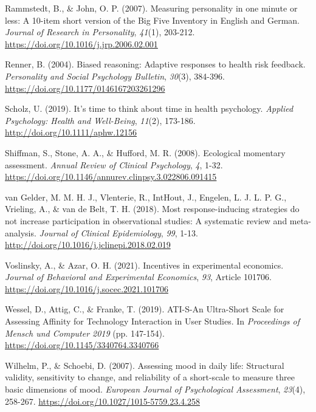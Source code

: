 \documentclass[authordate, empirical]{jote-new-article}
\begin{document}
	Rammstedt, B., \& John, O. P. (2007). Measuring personality in one minute or less: A 10-item short version of the Big Five Inventory in English and German. \emph{Journal of Research in Personality},\emph{ 41}(1), 203-212. \href{https://doi.org/10.1016/j.jrp.2006.02.001}{https://doi.org/10.1016/j.jrp.2006.02.001}



	Renner, B. (2004). Biased reasoning: Adaptive responses to health risk feedback. \emph{Personality and Social Psychology Bulletin},\emph{ 30}(3), 384-396. \href{https://doi.org/10.1177/0146167203261296}{https://doi.org/10.1177/0146167203261296}



	Scholz, U. (2019). It's time to think about time in health psychology. \emph{Applied Psychology: Health and Well-Being},\emph{ 11}(2), 173-186. \href{http://doi.org/10.1111/aphw.12156}{http://doi.org/10.1111/aphw.12156}



	Shiffman, S., Stone, A. A., \& Hufford, M. R. (2008). Ecological momentary assessment. \emph{Annual Review of Clinical Psychology},\emph{ 4}, 1-32. \href{https://doi.org/10.1146/annurev.clinpsy.3.022806.091415}{https://doi.org/10.1146/annurev.clinpsy.3.022806.091415}



	van Gelder, M. M. H. J., Vlenterie, R., IntHout, J., Engelen, L. J. L. P. G., Vrieling, A., \& van de Belt, T. H. (2018). Most response-inducing strategies do not increase participation in observational studies: A systematic review and meta-analysis. \emph{Journal of Clinical Epidemiology},\emph{ 99}, 1-13. \href{http://doi.org/10.1016/j.jclinepi.2018.02.019}{http://doi.org/10.1016/j.jclinepi.2018.02.019}



	Voslinsky, A., \& Azar, O. H. (2021). Incentives in experimental economics. \emph{Journal of Behavioral and Experimental Economics},\emph{ 93}, Article 101706. \href{https://doi.org/10.1016/j.socec.2021.101706}{https://doi.org/10.1016/j.socec.2021.101706}



	Wessel, D., Attig, C., \& Franke, T. (2019). ATI-S-An Ultra-Short Scale for Assessing Affinity for Technology Interaction in User Studies. In \emph{Proceedings of Mensch und Computer 2019} (pp. 147-154). \href{https://doi.org/10.1145/3340764.3340766}{https://doi.org/10.1145/3340764.3340766}



	Wilhelm, P., \& Schoebi, D. (2007). Assessing mood in daily life: Structural validity, sensitivity to change, and reliability of a short-scale to measure three basic dimensions of mood. \emph{European Journal of Psychological Assessment},\emph{ 23}(4), 258-267. \href{https://doi.org/10.1027/1015-5759.23.4.258}{https://doi.org/10.1027/1015-5759.23.4.258}
\end{document}
